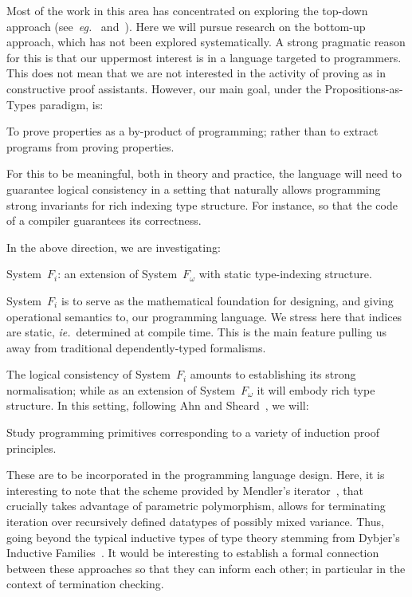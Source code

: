 \documentclass[11pt,twocolumn]{article}
\newcounter{CC}
\newenvironment{resenumerate}
  {\begin{list}{[\textbf{\arabic{CC}]}}
  {\usecounter{CC}
   \setlength{\topsep}{2pt}
   \setlength{\partopsep}{2pt}
   \setlength{\itemsep}{2.5pt}
   \setlength{\parsep}{2.5pt}
   \setlength{\leftmargin}{1.65em}
   \setlength{\labelwidth}{1.15em}
 }}
  {\end{list}}
\newcommand{\eg}{\emph{eg.}}
\newcommand{\ie}{\emph{ie.}}
\newcommand{\SystemFi}{\mbox{System~$F_i$}}
\newcommand{\SystemFomega}{\mbox{System~$F_\omega$}}
\begin{document}
Most of the work in this area has concentrated on exploring the top-down
approach (see~\eg~\cite{Cayenne} and~\cite{Epigram}).  Here we will pursue
research on the bottom-up approach, which has not been explored
systematically.  A strong pragmatic reason for this is that our uppermost
interest is in a language targeted to programmers.  This does not mean that we
are not interested in the activity of proving as in constructive proof
assistants.  However, our main goal, under the Propositions-as-Types paradigm,
is: 
\begin{resenumerate}\setcounter{CC}{1}
\item
  To prove properties as a by-product of programming; rather than to extract
  programs from proving properties.
\end{resenumerate}
For this to be meaningful, both in theory and practice, the language will
need to guarantee logical consistency in a setting that naturally allows
programming strong invariants for rich indexing type structure.  For
instance, so that the code of a compiler guarantees its correctness.

In the above direction, we are investigating:
\begin{resenumerate}\setcounter{CC}{2}
\item
  {\SystemFi}: an extension of {\SystemFomega} with static type-indexing
  structure.
\end{resenumerate}
{\SystemFi} is to serve as the mathematical foundation for designing, and
giving operational semantics to, our programming language.  We stress here
that indices are static, \ie~determined at compile time.  This is the main
feature pulling us away from traditional dependently-typed formalisms.

The logical consistency of {\SystemFi} amounts to establishing its strong
normalisation; while as an extension of {\SystemFomega} it will embody
rich type structure.  In this setting, following Ahn and
Sheard~\cite{AhnSheard11}, we will:
\begin{resenumerate}\setcounter{CC}{3}
\item
  Study programming primitives corresponding to a variety of induction
  proof principles.
\end{resenumerate}
These are to be incorporated in the programming language design.  Here, it
is interesting to note that the scheme provided by Mendler's
iterator~\cite{MendlerIter}, that crucially takes advantage of
parametric polymorphism, allows for terminating iteration over recursively
defined datatypes of possibly mixed variance.  Thus, going beyond the
typical inductive types of type theory stemming from Dybjer's Inductive
Families~\cite{DybjerIF}.  It would be interesting to establish a formal
connection between these approaches so that they can inform each other;
in particular in the context of termination checking. %
\end{document}
